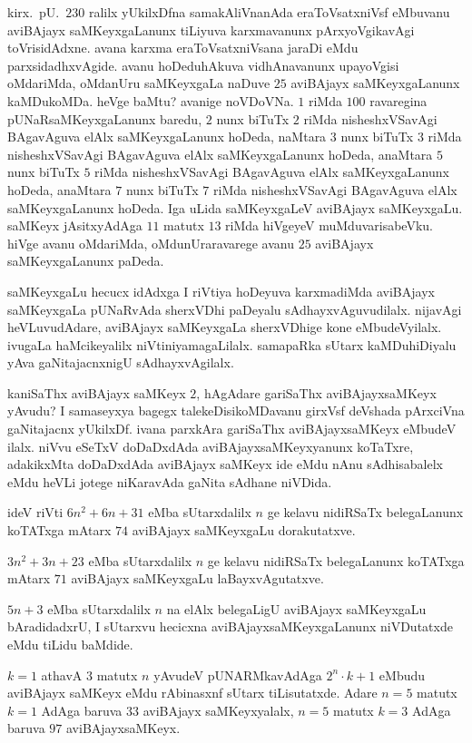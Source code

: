 kirx.~pU.\ $230$ ralilx yUkilxDfna samakAliVnanAda eraToVsatxniVsf eMbuvanu aviBAjayx saMKeyxgaLanunx tiLiyuva karxmavanunx pArxyoVgikavAgi toVrisidAdxne. avana karxma eraToVsatxniVsana jaraDi eMdu parxsidadhxvAgide. avanu hoDeduhAkuva vidhAna\-vanunx upayoVgisi oMdariMda, oMdanUru saMKeyxgaLa naDuve $25$ aviBAjayx saMKeyxgaLanunx kaMDukoMDa. heVge baMtu? avanige noVDoVNa. $1$ riMda $100$ ravaregina pUNaRsaMKeyxgaLanunx baredu, $2$ nunx biTuTx $2$ riMda nisheshxVSavAgi BAgavAguva elAlx saMKeyxgaLanunx hoDeda, naMtara $3$ nunx biTuTx $3$ riMda nisheshxVSavAgi BAgavAguva elAlx saMKeyxgaLanunx hoDeda, anaMtara $5$ nunx biTuTx $5$ riMda nisheshxVSavAgi BAgavAguva elAlx saMKeyxgaLanunx hoDeda, anaMtara $7$ nunx biTuTx $7$ riMda nisheshxVSavAgi BAgavAguva elAlx saMKeyxgaLanunx hoDeda. Iga uLida saMKeyxgaLeV aviBAjayx saMKeyxgaLu. saMKeyx jAsitxyAdAga $11$ matutx $13$ riMda hiVgeyeV muMduvarisabeVku. hiVge avanu oMdariMda, oMdunUraravarege avanu $25$ aviBAjayx saMKeyxgaLanunx paDeda.

saMKeyxgaLu hecucx idAdxga I riVtiya hoDeyuva karxmadiMda aviBAjayx saMKeyxgaLa pUNaRvAda sherxVDhi paDeyalu sAdhayxvAguvudilalx. nijavAgi heVLuvudAdare, aviBAjayx saMKeyxgaLa sherxVDhige kone eMbudeVyilalx. ivugaLa haMcikeyalilx niVtiniyamagaLilalx. samapaRka sUtarx kaMDuhiDiyalu yAva gaNitajacnxnigU sAdhayxvAgilalx. 

kaniSaThx aviBAjayx saMKeyx $2$, hAgAdare gariSaThx aviBAjayxsaMKeyx yAvudu? I samaseyxya bagegx talekeDisikoMDavanu girxVsf deVshada pArxciVna gaNitajacnx yUkilxDf. ivana parxkAra gariSaThx aviBAjayxsaMKeyx eMbudeV ilalx. niVvu eSeTxV doDaDxdAda aviBAjayxsaMKeyxyanunx koTaTxre, adakikxMta doDaDxdAda aviBAjayx saMKeyx ide eMdu nAnu sAdhisabalelx eMdu heVLi jotege niKaravAda gaNita sAdhane niVDida.

\newpage

ideV riVti $6n^2+6n+31$ eMba sUtarxdalilx $n$ ge kelavu nidiRSaTx belegaLanunx koTATxga mAtarx $74$ aviBAjayx saMKeyxgaLu dorakutatxve.

$3n^2+3n+23$ eMba sUtarxdalilx $n$ ge kelavu nidiRSaTx belegaLanunx koTATxga mAtarx $71$ aviBAjayx saMKeyxgaLu laBayxvAgutatxve.

$5n+3$ eMba sUtarxdalilx $n$ na elAlx belegaLigU aviBAjayx saMKeyxgaLu bAradidadxrU, I sUtarxvu hecicxna aviBAjayxsaMKeyxgaLanunx niVDutatxde eMdu tiLidu baMdide.

$k=1$ athavA $3$ matutx $n$ yAvudeV pUNARMkavAdAga $2^{n}\cdot k+1$ eMbudu aviBAjayx saMKeyx eMdu rAbinasxnf sUtarx tiLisutatxde. Adare $n=5$ matutx $k=1$ AdAga baruva $33$ aviBAjayx saMKeyxyalalx, $n=5$ matutx $k=3$ AdAga baruva $97$ aviBAjayxsaMKeyx.


